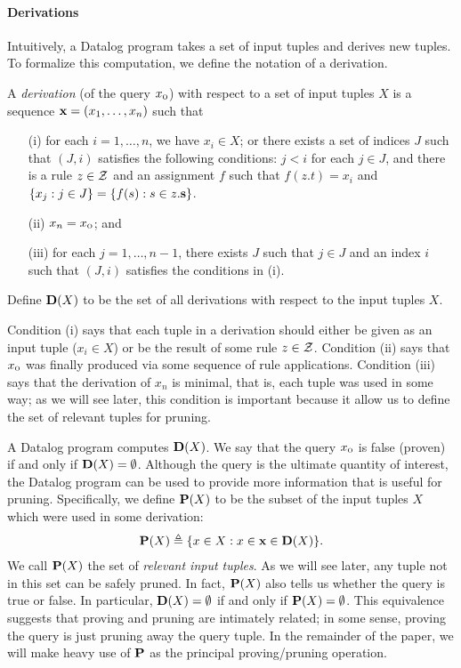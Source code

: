 \paragraph{Derivations}

Intuitively, a Datalog program takes a set of input tuples and derives new
tuples.  To formalize this computation, we define the notation of a derivation.

A {\em derivation} (of the query $x_\text{\sc o}$) with respect to a set of input tuples
$X$ is a sequence $\mathbf{x} = (x_1, \dots, x_n)$ such that
\begin{enumerate}
\item [(i)] for each $i = 1, \dots, n$, we have $x_i \in X$; or
there exists a set of indices $J$ such that $(J,i)$ satisfies the following conditions:
$j < i$ for each $j \in J$, and
there is a rule $z \in \mathcal{Z}$ and an assignment $f$
such that $f(z.t) = x_i$ and
$\{ x_j : j \in J \} = \{ f(s) : s \in z.\mathbf{s} \}$.
\item [(ii)] $x_n = x_\text{\sc o}$; and
\item [(iii)] 
for each $j = 1, \dots, n\!-\!1$,
there exists $J$ such that $j \in J$ and an index $i$
such that $(J,i)$ satisfies the conditions in (i).
\end{enumerate}
Define $\mathbf{D}(X)$ to be the set of all derivations with respect to the input tuples $X$.

Condition (i) says that each tuple in a derivation
should either be given as an input tuple ($x_i \in X$)
or be the result of some rule $z \in \mathcal{Z}$.
Condition (ii) says that $x_\text{\sc o}$ was finally produced via some sequence of rule applications.
Condition (iii) says that the derivation of $x_n$ is minimal, that is, each tuple was
used in some way; as we will see later, this condition is important because it allow us to
define the set of relevant tuples for pruning.

A Datalog program computes $\mathbf{D}(X)$.
We say that the query $x_\text{\sc o}$ is false (proven) if and only if $\mathbf{D}(X) = \emptyset$.
Although the query is the ultimate quantity of interest,
the Datalog program can be used to provide more information that is useful for pruning.
Specifically, we define $\mathbf{P}(X)$ to be the subset of the input tuples $X$
which were used in some derivation:
\begin{align}
\label{eqn:Pdef}
\mathbf{P}(X) \triangleq \{ x \in X : x \in \mathbf{x} \in \mathbf{D}(X) \}.
\end{align}
We call $\mathbf{P}(X)$ the set of {\em relevant input tuples}.  As we will see later,
any tuple not in this set can be safely pruned.
In fact, $\mathbf{P}(X)$ also tells us whether the query is true or false.
In particular, $\mathbf{D}(X) = \emptyset$ if and only if $\mathbf{P}(X) = \emptyset$.
This equivalence suggests that proving and pruning are intimately related;
in some sense, proving the query is just pruning away the query tuple.
In the remainder of the paper, we will make heavy use of $\mathbf{P}$ as the principal
proving/pruning operation.

